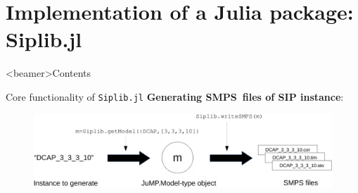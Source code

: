\documentclass{beamer}
\newcommand{\smps}{\textsf{SMPS}}
\newcommand{\structjump}{\textsf{StructJuMP}}
\newcommand{\siplibjl}{\texttt{Siplib.jl}}
\begin{document}
%		
%		
%		
%		
%		
%		
%		


	\section{Implementation of a Julia package: Siplib.jl}
	\begin{frame}<beamer>{Contents}
	\end{frame}	

	\begin{frame}{Core functionality of \siplibjl}
		\textbf{Generating \smps\ files of SIP instance}:
		\begin{figure}
			\begin{center}
				\includegraphics[width=\textwidth]{siplib_package}
			\end{center}
		\end{figure}	
	\end{frame}
\end{document}
